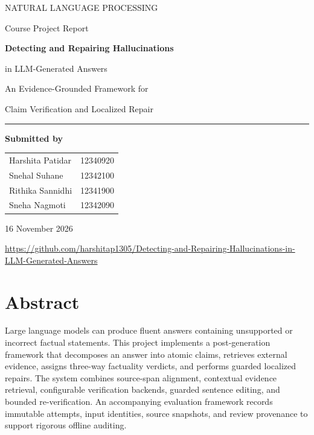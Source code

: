 \documentclass[11pt,a4paper]{article}
\newcommand{\Institution}{}
\newcommand{\Supervisor}{}
\begin{document}
\begin{titlepage}
\centering
\vspace*{15mm}
{\color{navy}\large NATURAL LANGUAGE PROCESSING\par}
\vspace{5mm}
{\large Course Project Report\par}
\vspace{16mm}
{\color{navy}\Huge\bfseries Detecting and Repairing Hallucinations\par}
\vspace{4mm}
{\LARGE in LLM-Generated Answers\par}
\vspace{8mm}
{\large An Evidence-Grounded Framework for\par Claim Verification and Localized Repair\par}
\vspace{9mm}
{\color{navy}\rule{0.82\textwidth}{1pt}}\par
\vspace{12mm}
{\large\bfseries Submitted by\par}
\vspace{5mm}
\renewcommand{\arraystretch}{1.45}
\begin{tabular}{lr}
Harshita Patidar & 12340920\\
Snehal Suhane & 12342100\\
Rithika Sannidhi & 12341900\\
Sneha Nagmoti & 12342090
\end{tabular}
\vfill
\Institution\par
\Supervisor\par
{\large 16 November 2026\par}
\vspace{6mm}
\small\url{https://github.com/harshitap1305/Detecting-and-Repairing-Hallucinations-in-LLM-Generated-Answers}
\end{titlepage}

\section*{Abstract}
Large language models can produce fluent answers containing unsupported or incorrect factual statements. This project implements a post-generation framework that decomposes an answer into atomic claims, retrieves external evidence, assigns three-way factuality verdicts, and performs guarded localized repairs. The system combines source-span alignment, contextual evidence retrieval, configurable verification backends, guarded sentence editing, and bounded re-verification. An accompanying evaluation framework records immutable attempts, input identities, source snapshots, and review provenance to support rigorous offline auditing.
\end{document}
